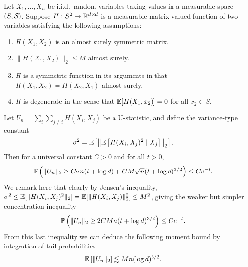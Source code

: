 \begin{lemma}
  \label{lem:ustat_matrix_concentration}

  Let $X_1, \ldots, X_n$ be i.i.d.\ random variables
  taking values in a measurable space $(S, \cS)$.
  Suppose
  $H: S^2 \to \R^{d \times d}$
  is a measurable matrix-valued function
  of two variables
  satisfying the following assumptions:
  \begin{enumerate}[label=(\roman*)]

    \item
      $H(X_1, X_2)$ is an almost surely symmetric matrix.

    \item
      $\|H(X_1, X_2)\|_2 \leq M$ almost surely.

    \item
      $H$ is a symmetric function in its arguments in that
      $H(X_1, X_2) = H(X_2, X_1)$ almost surely.

    \item
      $H$ is degenerate in the sense that
      $\E[H(X_1, x_2)] = 0$ for all $x_2 \in S$.

  \end{enumerate}
  Let $U_n = \sum_i \sum_{j \neq i} H(X_i, X_j)$
  be a U-statistic,
  and define the variance-type constant
  \begin{align*}
    \sigma^2
    &=
    \E\left[
      \left\|
      \E\left[
        H(X_i, X_j)^2
        \mid X_j
      \right]
      \right\|_2
    \right].
  \end{align*}
  Then for a universal constant $C > 0$
  and for all $t > 0$,
  \begin{align*}
    \P\left(
      \|U_n\|_2
      \geq
      C \sigma n (t + \log d)
      + C M \sqrt{n} (t + \log d)^{3/2}
    \right)
    &\leq
    C e^{-t}.
  \end{align*}
  We remark here that clearly
  by Jensen's inequality,
  $\sigma^2 \leq \E[ \| H(X_i, X_j)^2 \|_2 ]
  = \E[ \| H(X_i, X_j) \|_2^2 ]
  \leq M^2$,
  giving the weaker but simpler concentration inequality
  \begin{align*}
    \P\left(
      \|U_n\|_2
      \geq
      2 C M n
      (t + \log d)^{3/2}
    \right)
    &\leq
    C e^{-t}.
  \end{align*}
  From this last inequality we can deduce the following moment bound
  by integration of tail probabilities.
  \begin{align*}
    \E\left[
      \|U_n\|_2
    \right]
    &\lesssim
    M n (\log d)^{3/2}.
  \end{align*}

\end{lemma}

